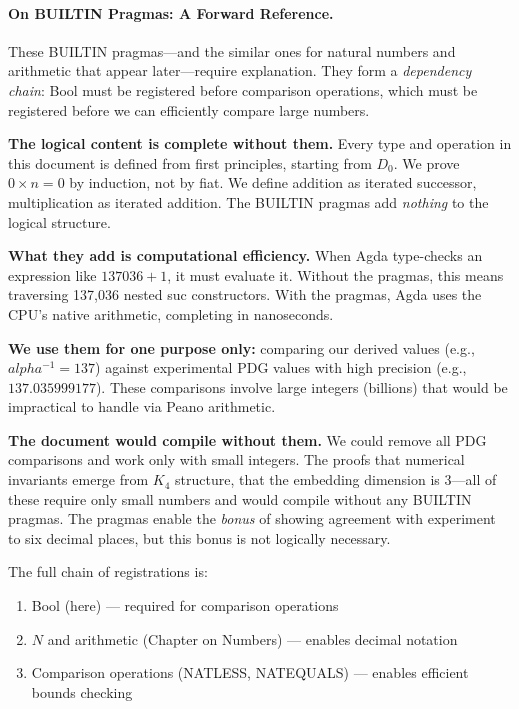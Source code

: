 \documentclass[11pt,a4paper]{book}
\def\alpha{alpha}%
\def\mathbb#1{#1}%
\def\texttt#1{#1}%
\begin{document}
\paragraph{On BUILTIN Pragmas: A Forward Reference.}
These \texttt{BUILTIN} pragmas---and the similar ones for natural numbers and arithmetic 
that appear later---require explanation. They form a \emph{dependency chain}: Bool must 
be registered before comparison operations, which must be registered before we can 
efficiently compare large numbers.

\textbf{The logical content is complete without them.} Every type and operation in this 
document is defined from first principles, starting from $D_0$. We prove $0 \times n = 0$ 
by induction, not by fiat. We define addition as iterated successor, multiplication as 
iterated addition. The BUILTIN pragmas add \emph{nothing} to the logical structure.

\textbf{What they add is computational efficiency.} When Agda type-checks an expression 
like $137036 + 1$, it must evaluate it. Without the pragmas, this means traversing 137,036 
nested \texttt{suc} constructors. With the pragmas, Agda uses the CPU's native arithmetic, 
completing in nanoseconds.

\textbf{We use them for one purpose only:} comparing our derived values (e.g., $\alpha^{-1} = 137$) 
against experimental PDG values with high precision (e.g., $137.035999177$). These comparisons 
involve large integers (billions) that would be impractical to handle via Peano arithmetic.

\textbf{The document would compile without them.} We could remove all PDG comparisons and 
work only with small integers. The proofs that numerical invariants emerge from $K_4$ structure, 
that the embedding dimension is $3$---all of these require only small numbers and would 
compile without any BUILTIN pragmas. The pragmas enable the \emph{bonus} of showing agreement 
with experiment to six decimal places, but this bonus is not logically necessary.

The full chain of registrations is:
\begin{enumerate}
\item Bool (here) --- required for comparison operations
\item $\mathbb{N}$ and arithmetic (Chapter on Numbers) --- enables decimal notation
\item Comparison operations (\texttt{NATLESS}, \texttt{NATEQUALS}) --- enables efficient bounds checking
\end{enumerate}
\end{document}
